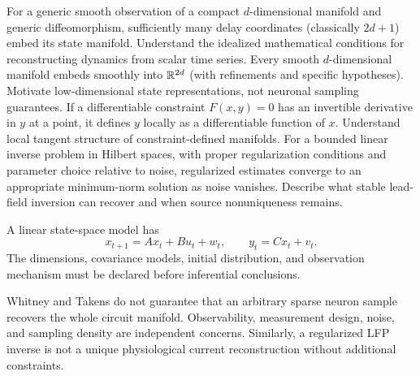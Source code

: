 {For a generic smooth observation of a compact $d$-dimensional
manifold and generic diffeomorphism, sufficiently many delay
coordinates (classically $2d+1$) embed its state manifold.}
{Understand the idealized mathematical conditions for reconstructing
dynamics from scalar time series.}
{Every smooth $d$-dimensional manifold embeds smoothly into
$\mathbb{R}^{2d}$ (with refinements and specific hypotheses).}
{Motivate low-dimensional state representations, not neuronal sampling guarantees.}
{If a differentiable constraint $F(x,y)=0$ has an invertible
derivative in $y$ at a point, it defines $y$ locally as a
differentiable function of $x$.}
{Understand local tangent structure of constraint-defined manifolds.}
{For a bounded linear inverse problem in Hilbert spaces, with
proper regularization conditions and parameter choice relative
to noise, regularized estimates converge to an appropriate
minimum-norm solution as noise vanishes.}
{Describe what stable lead-field inversion can recover and when
source nonuniqueness remains.}

\begin{definition}
A linear state-space model has
\[
x_{t+1}=Ax_t+Bu_t+w_t,\qquad y_t=Cx_t+v_t.
\]
The dimensions, covariance models, initial distribution, and
observation mechanism must be declared before inferential conclusions.
\end{definition}

\begin{caution}
Whitney and Takens do not guarantee that an arbitrary sparse neuron
sample recovers the whole circuit manifold. Observability,
measurement design, noise, and sampling density are independent concerns.
Similarly, a regularized LFP inverse is not a unique physiological
current reconstruction without additional constraints.
\end{caution}
